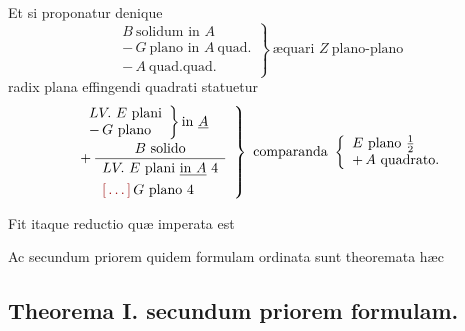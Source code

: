 \documentclass[11pt,a4paper]{article}
\begin{document}
Et si proponatur denique
\[ \left.\begin{array}{l} B\ \text{solidum in } A \\ -\,G\ \text{plano in } A\ \text{quad.} \\ -\,A\ \text{quad.quad.} \end{array}\right\}\ \text{æquari } Z\ \text{plano-plano} \]
radix plana effingendi quadrati statuetur
\[ \left.\begin{array}{l} \left.\begin{array}{l} LV.\ E\ \text{plani} \\ -\,G\ \text{plano} \end{array}\right\} \text{in } \underline{A} \\[2ex] +\,\dfrac{B\ \text{solido}}{\begin{array}{l} LV.\ E\ \text{plani } \struck{\text{in } A}\ 4 \\ \ill{}\,G\ \text{plano } 4 \end{array}} \end{array}\right\}\ \text{comparanda } \left\{\begin{array}{l} E\ \text{plano } \frac{1}{2} \\ +\,A\ \text{quadrato.} \end{array}\right. \]

Fit itaque  reductio quæ imperata est

Ac secundum priorem quidem formulam ordinata sunt theoremata hæc

\subsection*{Theorema I. secundum priorem formulam.}
\end{document}
